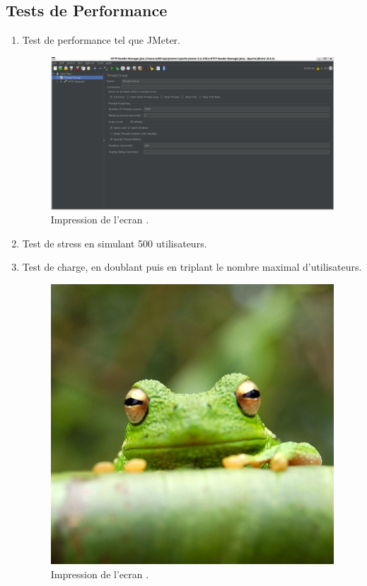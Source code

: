 \documentclass{article}
\begin{document}
\subsection{Tests de Performance}

\begin{enumerate}
    \item Test de performance tel que JMeter.
      \begin{figure}[H]
    \centering
    \includegraphics[width=1\linewidth]{assets/Screenshot 2024-12-15 193747.png}
    \caption{\label{fig:frog11} Impression de l'ecran .}
    \end{figure}
    \item Test de stress en simulant 500 utilisateurs.
     
    \item Test de charge, en doublant puis en triplant le nombre maximal d’utilisateurs.
      \begin{figure}[H]
    \centering
    \includegraphics[width=0.5\linewidth]{assets/frog.jpg}
    \caption{\label{fig:frog13} Impression de l'ecran .}
    \end{figure}
\end{enumerate}
\end{document}
